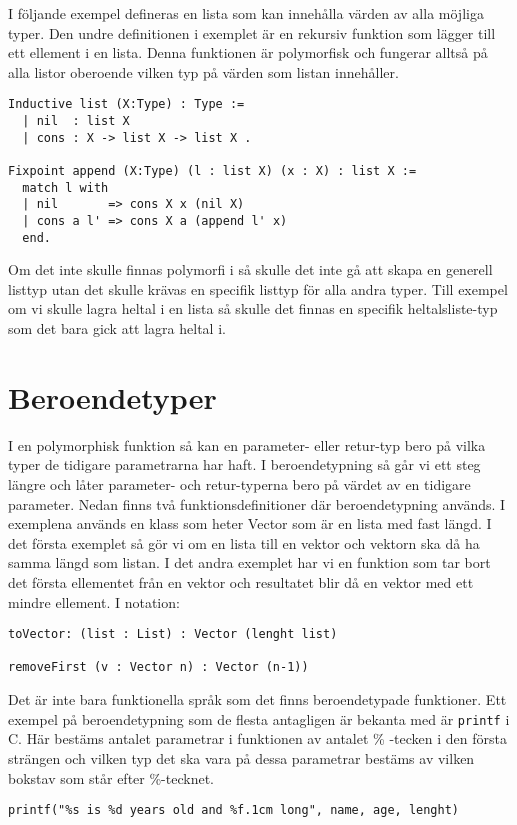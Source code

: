 I följande exempel defineras en lista som kan innehålla värden av alla möjliga
typer. Den undre definitionen i exemplet är en rekursiv funktion som lägger
till ett ellement i en lista. Denna funktionen är polymorfisk och fungerar
alltså på alla listor oberoende vilken typ på värden som listan innehåller.
\begin{lstlisting}
Inductive list (X:Type) : Type :=
  | nil  : list X
  | cons : X -> list X -> list X .

Fixpoint append (X:Type) (l : list X) (x : X) : list X :=
  match l with
  | nil       => cons X x (nil X)
  | cons a l' => cons X a (append l' x)
  end.
\end{lstlisting}

Om det inte skulle finnas polymorfi i \coq så skulle det inte gå att skapa en
generell listtyp utan det skulle krävas en specifik listtyp för alla andra
typer. Till exempel om vi skulle lagra heltal i en lista så skulle det finnas
en specifik heltalsliste-typ som det bara gick att lagra heltal i.

\section{Beroendetyper}
I en polymorphisk funktion så kan en parameter- eller retur-typ bero på vilka
typer de tidigare parametrarna har haft. I beroendetypning så går vi ett steg
längre och låter parameter- och retur-typerna bero på värdet av en
tidigare parameter.
Nedan finns två funktionsdefinitioner där beroendetypning används.
I exemplena används en klass som heter Vector som är en lista med fast längd. I
det första exemplet så gör vi om en lista till en vektor och vektorn ska då ha
samma längd som listan. I det andra exemplet har vi en funktion som tar bort
det första ellementet från en vektor och resultatet blir då en vektor med ett
mindre ellement. I \coq notation:
\begin{verbatim}
toVector: (list : List) : Vector (lenght list)

removeFirst (v : Vector n) : Vector (n-1))
\end{verbatim}

Det är inte bara funktionella språk som det finns beroendetypade funktioner.
Ett exempel på beroendetypning som de flesta antagligen är bekanta med är
\texttt{printf} i C. Här bestäms antalet parametrar i funktionen av antalet
\% -tecken i den första strängen och vilken typ det ska vara på dessa
parametrar bestäms av vilken bokstav som står efter \%-tecknet.
\begin{verbatim}
printf("%s is %d years old and %f.1cm long", name, age, lenght)
\end{verbatim}

